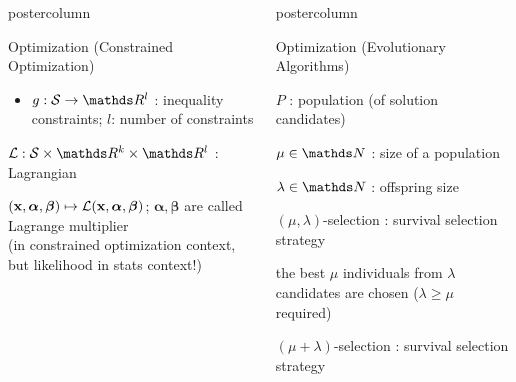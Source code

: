 \documentclass[11pt,compress,t,notes=noshow, xcolor=table]{beamer}
\newlength{\columnheight} %
\begin{document}
\begin{frame}[fragile]{}
\begin{columns}
\begin{column}{.31\textwidth}
\begin{beamercolorbox}[center]{postercolumn}
\begin{minipage}{.98\textwidth}
{\begin{myblock}{Optimization (Constrained Optimization)}
\begin{itemize}
							\item \quad $g: \mathcal{S} \to \R^l$ : inequality constraints; $l$: number of constraints
						\end{itemize} \hspace{1ex} 
						\begin{codebox}
							 $\mathcal{L}: \mathcal{S} \times \R^k \times \R^l$ : Lagrangian
						\end{codebox}
						\hspace*{1ex} $(\mathbf{x}, \bm{\alpha}, \bm{\beta}) \mapsto \mathcal{L}(\mathbf{x}, \bm{\alpha}, \bm{\beta})$; $\bm{\alpha}, \bm{\beta}$ are called Lagrange multiplier \\
						\hspace*{1ex} (in constrained optimization context, but likelihood in stats context!)
					\end{myblock}											
					}
			\end{minipage}
		\end{beamercolorbox}
	\end{column}
	\begin{column}{.31\textwidth}
		\begin{beamercolorbox}[center]{postercolumn}
			\begin{minipage}{.98\textwidth}
				\parbox[t][\columnheight]{\textwidth}{
					\begin{myblock}{Optimization (Evolutionary Algorithms)}
						\begin{codebox}
							 $P$ : population (of solution candidates)
						\end{codebox}
						\hspace*{1ex} 
						\begin{codebox}
							 $\mu \in \N$ : size of a population
						\end{codebox}
						\hspace*{1ex} 
						\begin{codebox}
							 $\lambda \in \N$ : offspring size
						\end{codebox}
						\hspace*{1ex} 
						\begin{codebox}
							 $(\mu, \lambda)$-selection : survival selection strategy
						\end{codebox}
						\hspace*{1ex} the best $\mu$ individuals from $\lambda$ candidates are chosen ($\lambda \ge \mu$ required) \\
						\begin{codebox}
							 $(\mu + \lambda)$-selection : survival selection strategy

\end{codebox}
\end{myblock}}
\end{minipage}
\end{beamercolorbox}
\end{column}
\end{columns}
\end{frame}
\end{document}

